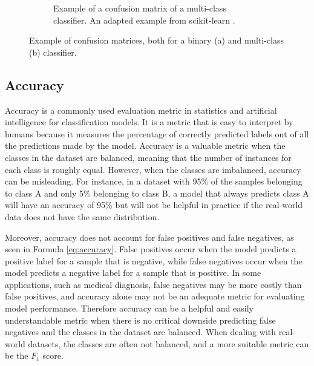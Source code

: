 \begin{figure}[htb]
{\begin{subfigure}[b]{0.5\textwidth}
             \caption{Example of a confusion matrix of a multi-class classifier. An adapted example from scikit-learn \cite{ConfusionMatrix}.}
             \label{fig:confusion_multi}
         \end{subfigure}
         }
        \caption[Example of confusion matrices, both binary and multi-class.]{Example of confusion matrices, both for a binary (a) and multi-class (b) classifier.%
        }
        \label{fig:confusion_matrices}
    \end{figure}


    \subsection{Accuracy}

    Accuracy is a commonly used evaluation metric in statistics and artificial intelligence for classification models. It is a metric that is easy to interpret by humans because it measures the percentage of correctly predicted labels out of all the predictions made by the model. Accuracy is a valuable metric when the classes in the dataset are balanced, meaning that the number of instances for each class is roughly equal. However, when the classes are imbalanced, accuracy can be misleading. For instance, in a dataset with 95\% of the samples belonging to class A and only 5\% belonging to class B, a model that always predicts class A will have an accuracy of 95\% but will not be helpful in practice if the real-world data does not have the same distribution.

    Moreover, accuracy does not account for false positives and false negatives, as seen in Formula \ref{eq:accuracy}. False positives occur when the model predicts a positive label for a sample that is negative, while false negatives occur when the model predicts a negative label for a sample that is positive. In some applications, such as medical diagnosis, false negatives may be more costly than false positives, and accuracy alone may not be an adequate metric for evaluating model performance. Therefore accuracy can be a helpful and easily understandable metric when there is no critical downside predicting false negatives and the classes in the dataset are balanced. When dealing with real-world datasets, the classes are often not balanced, and a more suitable metric can be the $F_1$ score.
    


